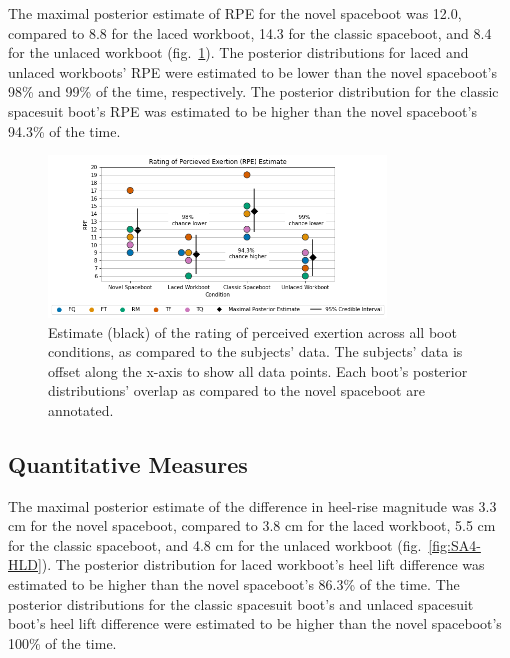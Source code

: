 \documentclass[defaultstyle,11pt]{thesis}
\begin{document}
The maximal posterior estimate of RPE for the novel spaceboot was 12.0, compared to 8.8 for the laced workboot, 14.3 for the classic spaceboot, and 8.4 for the unlaced workboot (fig.~\ref{fig:SA4-RPE}).
The posterior distributions for laced and unlaced workboots' RPE were estimated to be lower than the novel spaceboot's 98\% and 99\% of the time, respectively.
The posterior distribution for the classic spacesuit boot's RPE was estimated to be higher than the novel spaceboot's 94.3\% of the time.

\hypertarget{fig:SA4-RPE}{%
\begin{figure}
\centering
\includegraphics[width=0.8\textwidth,height=\textheight]{../fig/SA4/RPE.png}
\caption[{Rating of perceived exertion posterior estimate}]{Estimate (black) of the rating of perceived exertion across all boot conditions, as compared to the subjects' data. The subjects' data is offset along the x-axis to show all data points. Each boot's posterior distributions' overlap as compared to the novel spaceboot are annotated.}
\label{fig:SA4-RPE}
\end{figure}
}

\hypertarget{quantitative-measures-1}{%
\subsection{Quantitative Measures}\label{quantitative-measures-1}}

The maximal posterior estimate of the difference in heel-rise magnitude was 3.3 cm for the novel spaceboot, compared to 3.8 cm for the laced workboot, 5.5 cm for the classic spaceboot, and 4.8 cm for the unlaced workboot (fig.~\ref{fig:SA4-HLD}).
The posterior distribution for laced workboot's heel lift difference was estimated to be higher than the novel spaceboot's 86.3\% of the time.
The posterior distributions for the classic spacesuit boot's and unlaced spacesuit boot's heel lift difference were estimated to be higher than the novel spaceboot's 100\% of the time.
\end{document}
